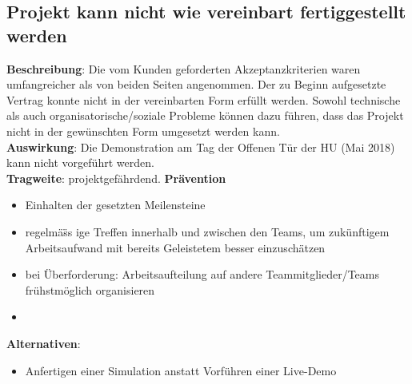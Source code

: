 \documentclass[a4paper, 12pt, titlepage]{scrartcl}
\begin{document}
	\subsection{Projekt kann nicht wie vereinbart fertiggestellt werden}
		\textbf{Beschreibung}: Die vom Kunden geforderten Akzeptanzkriterien waren umfangreicher als von beiden Seiten angenommen. Der zu Beginn aufgesetzte Vertrag konnte nicht in der vereinbarten Form erf\"ullt werden. Sowohl technische als auch organisatorische/soziale Probleme k\"onnen dazu f\"uhren, dass das Projekt nicht in der gew\"unschten Form umgesetzt werden kann.\\
		\textbf{Auswirkung}: Die Demonstration am Tag der Offenen T\"ur der HU (Mai 2018) kann nicht vorgef\"uhrt werden.\\
		\textbf{Tragweite}: projektgef\"ahrdend. 
		\textbf{Pr\"avention}
			\begin{itemize}
				\item Einhalten der gesetzten Meilensteine
				\item regelm\"a\"ss ige Treffen innerhalb und zwischen den Teams, um zuk\"unftigem Arbeitsaufwand mit bereits Geleistetem besser einzusch\"atzen
				\item bei \"Uberforderung: Arbeitsaufteilung auf andere Teammitglieder/Teams fr\"uhstm\"oglich organisieren
				\item 
			\end{itemize}
		\textbf{Alternativen}: 
			\begin{itemize}
				\item Anfertigen einer Simulation anstatt Vorf\"uhren einer Live-Demo
			\end{itemize}
		
\end{document}
